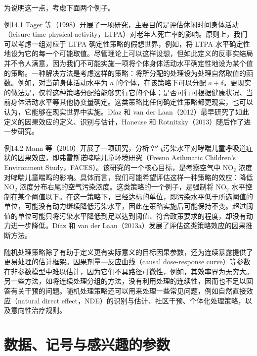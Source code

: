为说明这一点，考虑下面两个例子。

\begin{bookresult}{例}{14.1}
Tager 等（1998）开展了一项研究，主要目的是评估休闲时间身体活动（leisure-time physical activity，LTPA）对老年人死亡率的影响。原则上，我们可以考虑一组对应于 LTPA 确定性策略的假想世界，例如，将 LTPA 水平确定性地设为它的每一个可能取值。尽管理论上可以这样设想，但如此定义的反事实结局并不令人满意，因为我们不可能实施一项将个体身体活动水平确定性地设为某个值的策略。一种解决方法是考虑这样的策略：将所分配的处理设为处理自然取值的函数。例如，对当前身体活动水平为 $a$ 的个体，在该策略下可以分配 $a+\delta$。更现实的做法是，仅将这种策略分配给能够实行它的个体；是否可行可根据健康状况、当前身体活动水平等其他协变量确定。这类策略比任何确定性策略都更现实，也可以认为，它能够在现实世界中实施。Díaz 和 van der Laan（2012）最早研究了如此定义的因果效应的定义、识别与估计，Haneuse 和 Rotnitzky（2013）随后作了进一步研究。
\end{bookresult}

\begin{bookresult}{例}{14.2}
Mann 等（2010）开展了一项研究，分析空气污染水平对哮喘儿童呼吸道症状的因果效应，即弗雷斯诺哮喘儿童环境研究（Fresno Asthmatic Children's Environment Study，FACES）。该研究的一个核心目标，是考察空气中 $\mathrm{NO}_2$ 浓度对哮喘儿童喘鸣的影响。具体而言，我们可能希望评估这样一种策略的效应：降低 $\mathrm{NO}_2$ 浓度分布右尾的空气污染浓度。这类策略的一个例子，是强制将 $\mathrm{NO}_2$ 水平控制在某个阈值以下。在这一策略下，已经达标的单位，即污染水平低于所选阈值的单位，可能没有动力继续降低污染水平，因此在策略实施后可能保持不变。超过阈值的单位可能只将污染水平降低到足以达到阈值、符合政策要求的程度，却没有动力进一步降低。Díaz 和 van der Laan（2013a）发展了评估这类策略效应的因果推断方法。
\end{bookresult}

随机处理策略除了有助于定义更有实际意义的目标因果参数，还为连续暴露提供了更易处理的估计框架。因果剂量—反应曲线（causal dose-response curve）等参数在非参数模型中难以估计，因为它们不具路径可微性，例如，其效率界为无穷大。另一些方法，如将连续处理分组的方法，没有利用处理的连续性，因而也不足以回答有关干预的问题。随机处理策略还可以用来处理一些常见问题，例如自然直接效应（natural direct effect，NDE）的识别与估计、社区干预、个体化处理策略，以及意向性治疗规则。

\section{数据、记号与感兴趣的参数}

